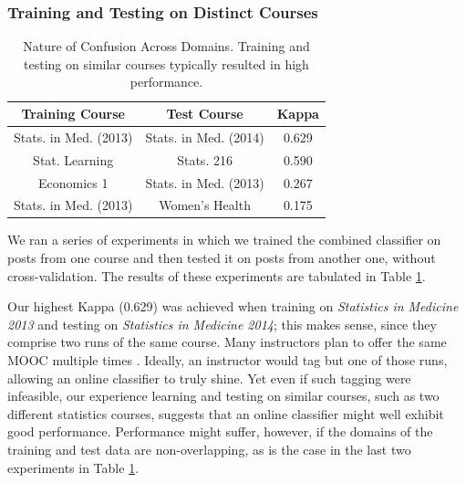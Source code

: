 \documentclass{edm_template}
\begin{document}
\subsubsection{Training and Testing on Distinct Courses}

\begin{table}[h!]
       \centering
       \begin{tabular}{|c|c|c|}
       \hline
       Training Course                & Test Course                    & Kappa \\ \hline
       Stats. in Med. (2013)  & Stats. in Med. (2014)  & 0.629 \\ \hline
       Stat. Learning           & Stats. 216                 & 0.590 \\ \hline
       Economics 1                    & Stats. in Med. (2013)  & 0.267 \\ \hline
       Stats. in Med. (2013)  & Women's Health                 & 0.175 \\ \hline
       \end{tabular}
       \vspace{-5pt}
       \caption{\textnormal{
       Nature of Confusion Across Domains. Training and testing on similar courses typically resulted in high performance.
       }} 
       \label{table:across_courses} %
\end{table}

We ran a series of experiments in which we trained the combined classifier on posts from one course and then tested it on posts from another one, without cross-validation. The results of these experiments are tabulated in Table \ref{table:across_courses}. 

Our highest Kappa (0.629) was achieved when training on \emph{Statistics in Medicine 2013} and testing on \emph{Statistics in Medicine 2014}; this makes sense, since they comprise two runs of the same course. Many instructors plan to offer the same MOOC multiple times \cite{hollands2014moocs}. Ideally, an instructor would tag but one of those runs, allowing an online classifier to truly shine. Yet even if such tagging were infeasible, our experience learning and testing on similar courses, such as two different statistics courses, suggests that an online classifier might well exhibit good performance. Performance might suffer, however, if the domains of the training and test data are non-overlapping, as is the case in the last two experiments in Table \ref{table:across_courses}.
\end{document}
